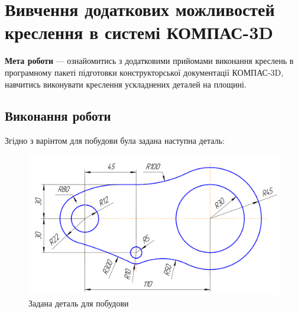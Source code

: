 \newpage\BorderFirstPage
\chapter[~]{Вивчення додаткових можливостей креслення в системі КОМПАС-3D}

\textbf{Мета роботи} --- ознайомитись з додатковими прийомами виконання креслень в програмному
пакеті підготовки конструкторської документації КОМПАС-3D, навчитись виконувати креслення
ускладнених деталей на площині.

\section{Виконання роботи}

Згідно з варінтом для побудови була задана наступна деталь:

\begin{figure}[!ht]
  \centering \includegraphics[width=0.9\linewidth]{./images/lab4/target_drawing.png}
  \caption{Задана деталь для побудови}
  \label{fig:lab3:target_part} 
\end{figure}
\FloatBarrier

